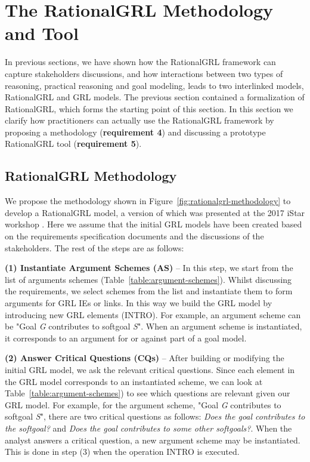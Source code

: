 \section{The RationalGRL Methodology and Tool}
\label{sect:methodology+tool}

In previous sections, we have shown how the RationalGRL framework can capture stakeholders discussions, and how interactions between two types of reasoning, practical reasoning and goal modeling, leads to two interlinked models, RationalGRL and GRL models. The previous section contained a formalization of RationalGRL, which forms the starting point of this section. In this section we clarify how practitioners can actually use the RationalGRL framework by proposing a methodology (\textbf{requirement 4}) and discussing a prototype RationalGRL tool (\textbf{requirement 5}).

\subsection{RationalGRL Methodology}
\label{sect:methodology} 

We propose the methodology shown in Figure~\ref{fig:rationalgrl-methodology} to develop a RationalGRL model, a version of which was presented at the 2017 iStar workshop \cite{ghanavatiMethodology}. Here we assume that the initial GRL models have been created based on the requirements specification documents and the discussions of the stakeholders. The rest of the steps are as follows:

\textbf{(1) Instantiate Argument Schemes (AS)} -- In this step, we start from the list of arguments schemes (Table~\ref{table:argument-schemes}). Whilst discussing the requirements, we select schemes from the list and instantiate them to form arguments for GRL IEs or links. In this way we build the GRL model by introducing new GRL elements (\textsf{INTRO}). For example, an argument scheme can be "Goal \emph{G} contributes to softgoal \emph{S}". When an argument scheme is instantiated, it corresponds to an argument for or against part of a goal model.

\textbf{(2) Answer Critical Questions (CQs)} -- After building or modifying the initial GRL model, we ask the relevant critical questions. Since each element in the GRL model corresponds to an instantiated scheme, we can look at Table~\ref{table:argument-schemes}) to see which questions are relevant given our GRL model. For example, for the argument scheme, "Goal \emph{G} contributes to softgoal \emph{S}", there are two critical questions as follows:  \emph{Does the goal contributes to the softgoal?} and \emph{Does the goal contributes to some other softgoals?}. When the analyst answers  a critical question, a new argument scheme may be instantiated. This is done in step (3) when the operation INTRO is executed.

